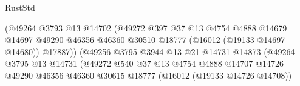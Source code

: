 \begin{lexlean}{RustStd}
\begin{coremodule}
                                                (@49264
                                                  @3793
                                                  @13
                                                  @14702
                                                  (@49272
                                                    @397
                                                    @37
                                                    @13
                                                    @4754
                                                    @4888
                                                    @14679
                                                    @14697
                                                    @49290
                                                    @46356
                                                    @46360
                                                    @30510
                                                    @18777
                                                    (@16012 (@19133 @14697 @14680))
                                                    @17887))
                                                (@49256
                                                  @3795
                                                  @3944
                                                  @13
                                                  @21
                                                  @14731
                                                  @14873
                                                  (@49264
                                                    @3795
                                                    @13
                                                    @14731
                                                    (@49272
                                                      @540
                                                      @37
                                                      @13
                                                      @4754
                                                      @4888
                                                      @14707
                                                      @14726
                                                      @49290
                                                      @46356
                                                      @46360
                                                      @30615
                                                      @18777
                                                      (@16012 (@19133 @14726 @14708))

\end{coremodule}
\end{lexlean}
